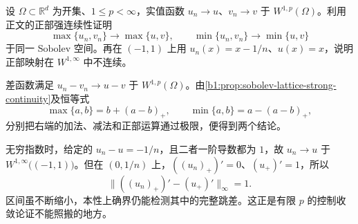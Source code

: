 \begin{exercise}\label{b1:ex:21-positive-part-continuity}
设 \(\Omega\subset\mathbb R^d\) 为开集、\(1\le p<\infty\)，实值函数
\(u_n\to u\)、\(v_n\to v\) 于 \(W^{1,p}(\Omega)\)。利用正文的正部强连续性证明
\[
 \max\{u_n,v_n\}\longrightarrow\max\{u,v\},\qquad
 \min\{u_n,v_n\}\longrightarrow\min\{u,v\}
\]
于同一 Sobolev 空间。再在 \((-1,1)\) 上用 \(u_n(x)=x-1/n\)、\(u(x)=x\)，说明正部映射在 \(W^{1,\infty}\) 中不连续。
\end{exercise}
\begin{solution}
差函数满足 \(u_n-v_n\to u-v\) 于 \(W^{1,p}(\Omega)\)。由\cref{b1:prop:sobolev-lattice-strong-continuity}及恒等式
\[
 \max\{a,b\}=b+(a-b)_+,\qquad
 \min\{a,b\}=a-(a-b)_+,
\]
分别把右端的加法、减法和正部运算通过极限，便得到两个结论。

无穷指数时，给定的 \(u_n-u=-1/n\)，且二者一阶导数都为 \(1\)，故 \(u_n\to u\) 于 \(W^{1,\infty}\bigl((-1,1)\bigr)\)。但在 \((0,1/n)\) 上，\(((u_n)_+)'=0\)、\((u_+)'=1\)，所以
\[
 \|((u_n)_+)'-(u_+)'\|_\infty=1.
\]
区间虽不断缩小，本性上确界仍能检测其中的完整跳差。这正是有限 \(p\) 的控制收敛论证不能照搬的地方。
\end{solution}


